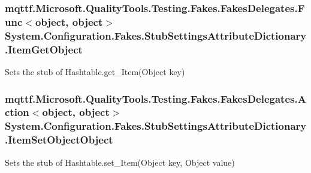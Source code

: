 \hypertarget{class_system_1_1_configuration_1_1_fakes_1_1_stub_settings_attribute_dictionary_ad3d4d1179f9c27bd5b2f870a23fe1d64}{
\subsubsection[{Item\-Get\-Object}]{\setlength{\rightskip}{0pt plus 5cm}mqttf.\-Microsoft.\-Quality\-Tools.\-Testing.\-Fakes.\-Fakes\-Delegates.\-Func$<$object, object$>$ System.\-Configuration.\-Fakes.\-Stub\-Settings\-Attribute\-Dictionary.\-Item\-Get\-Object}}\label{class_system_1_1_configuration_1_1_fakes_1_1_stub_settings_attribute_dictionary_ad3d4d1179f9c27bd5b2f870a23fe1d64}


Sets the stub of Hashtable.\-get\-\_\-\-Item(\-Object key)

\hypertarget{class_system_1_1_configuration_1_1_fakes_1_1_stub_settings_attribute_dictionary_a82cb99935a5c5d1f4e6e6943dd19197a}{
\subsubsection[{Item\-Set\-Object\-Object}]{\setlength{\rightskip}{0pt plus 5cm}mqttf.\-Microsoft.\-Quality\-Tools.\-Testing.\-Fakes.\-Fakes\-Delegates.\-Action$<$object, object$>$ System.\-Configuration.\-Fakes.\-Stub\-Settings\-Attribute\-Dictionary.\-Item\-Set\-Object\-Object}}\label{class_system_1_1_configuration_1_1_fakes_1_1_stub_settings_attribute_dictionary_a82cb99935a5c5d1f4e6e6943dd19197a}


Sets the stub of Hashtable.\-set\-\_\-\-Item(\-Object key, Object value)

